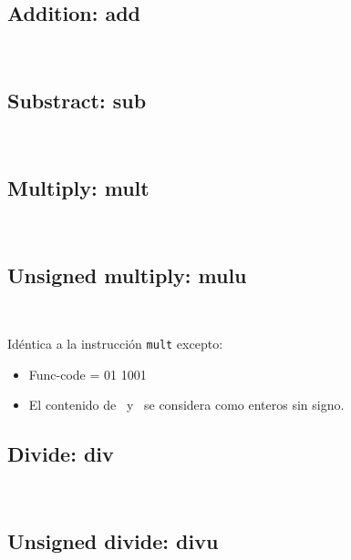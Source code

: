 \documentclass[12pt]{amsart}
\begin{document}
	\subsection{Addition: \textbf{add}}\ 
	
	
	
	\subsection{Substract: \textbf{sub}}\ 
	
	
	
	\subsection{Multiply: \textbf{mult}}\ 
	
	
	
	\subsection{Unsigned multiply: \textbf{mulu}}\ 
	
	Idéntica a la instrucción \texttt{mult} excepto:
	\begin{itemize}
		\item Func-code = 01 1001
		\item El contenido de \Rs\ y \Rt\ se considera como enteros sin signo.
	\end{itemize}
	
	\subsection{Divide: \textbf{div}}\ 
	
	
	
	\subsection{Unsigned divide: \textbf{divu}}\ 
	
\end{document}
